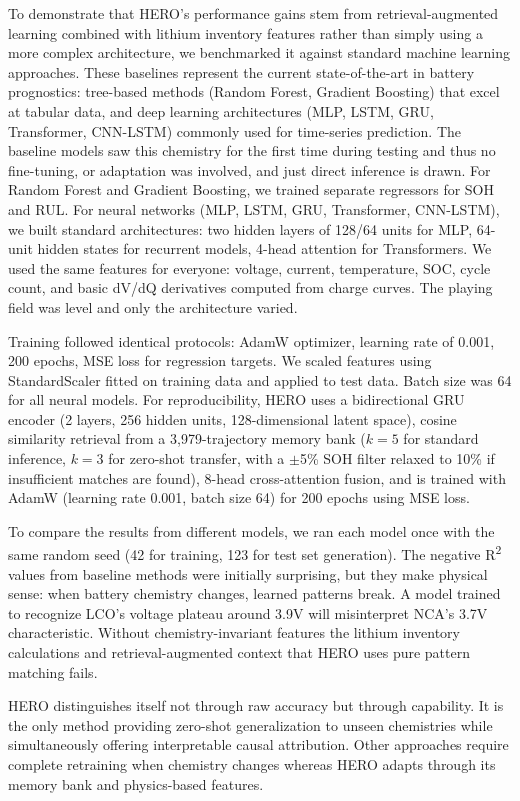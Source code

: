 \documentclass[5p,times,authoryear]{elsarticle}
\begin{document}
To demonstrate that HERO's performance gains stem from retrieval-augmented learning combined with lithium inventory features rather than simply using a more complex architecture, we benchmarked it against standard machine learning approaches. These baselines represent the current state-of-the-art in battery prognostics: tree-based methods (Random Forest, Gradient Boosting) that excel at tabular data, and deep learning architectures (MLP, LSTM, GRU, Transformer, CNN-LSTM) commonly used for time-series prediction. The baseline models saw this chemistry for the first time during testing and thus no fine-tuning, or adaptation was involved, and just direct inference is drawn. For Random Forest and Gradient Boosting, we trained separate regressors for SOH and RUL. For neural networks (MLP, LSTM, GRU, Transformer, CNN-LSTM), we built standard architectures: two hidden layers of 128/64 units for MLP, 64-unit hidden states for recurrent models, 4-head attention for Transformers. We used the same features for everyone: voltage, current, temperature, SOC, cycle count, and basic dV/dQ derivatives computed from charge curves. The playing field was level and only the architecture varied.

Training followed identical protocols: AdamW optimizer, learning rate of 0.001, 200 epochs, MSE loss for regression targets. We scaled features using StandardScaler fitted on training data and applied to test data. Batch size was 64 for all neural models. For reproducibility, HERO uses a bidirectional GRU encoder (2 layers, 256 hidden units, 128-dimensional latent space), cosine similarity retrieval from a 3,979-trajectory memory bank ($k{=}5$ for standard inference, $k{=}3$ for zero-shot transfer, with a $\pm$5\% SOH filter relaxed to 10\% if insufficient matches are found), 8-head cross-attention fusion, and is trained with AdamW (learning rate 0.001, batch size 64) for 200 epochs using MSE loss.

To compare the results from different models, we ran each model once with the same random seed (42 for training, 123 for test set generation). The negative R\textsuperscript{2} values from baseline methods were initially surprising, but they make physical sense: when battery chemistry changes, learned patterns break. A model trained to recognize LCO's voltage plateau around 3.9V will misinterpret NCA's 3.7V characteristic. Without chemistry-invariant features the lithium inventory calculations and retrieval-augmented context that HERO uses pure pattern matching fails.

HERO distinguishes itself not through raw accuracy but through capability. It is the only method providing  zero-shot generalization to unseen chemistries while simultaneously offering interpretable causal attribution. Other approaches require complete retraining when chemistry changes whereas HERO adapts through its memory bank and physics-based features.
\end{document}

